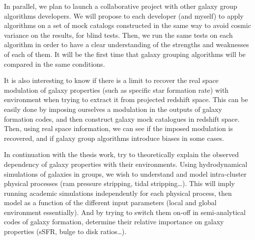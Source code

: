In parallel, we plan to launch a collaborative project with other galaxy group
algorithms developers. We will propose to each developer (and myself) to apply
algorithms on a set of mock catalogs constructed in the same way to avoid
cosmic variance on the results, for blind tests. Then, we run the same tests on
each algorithm in order to have a clear understanding of the strengths and
weaknesses of each of them. It will be the first time that galaxy grouping
algorithms will be compared in the same conditions.

It is also interesting to know if there is a limit to recover the real space
modulation of galaxy properties (such as specific star formation rate) with
environment when trying to extract it from projected redshift space. This can
be easily done by imposing ourselves a modulation in the outputs of galaxy
formation codes, and then construct galaxy mock catalogues in redshift space.
Then, using real space information, we can see if the imposed modulation is
recovered, and if galaxy group algorithms introduce biases in some cases.

In continuation with the thesis work, try to theoretically explain the observed
dependency of galaxy properties with their environments. Using hydrodynamical
simulations of galaxies in groups, we wish to understand and model
intra-cluster physical processes (ram pressure stripping, tidal
stripping\ldots). This will imply running academic simulations independently
for each physical process, then model as a function of the different input
parameters (local and global environment essentially). And by trying to switch
them on-off in semi-analytical codes of galaxy formation, determine their
relative importance on galaxy properties (sSFR, bulge to disk ratios\ldots).

